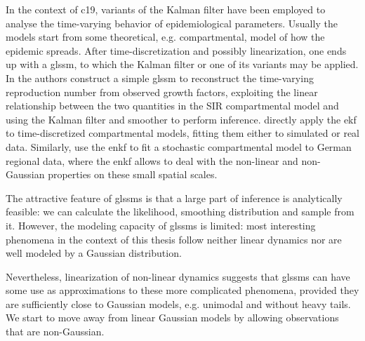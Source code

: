 In the context of \acrshort{c19}, variants of the Kalman filter have been employed to analyse the time-varying behavior of epidemiological parameters. Usually the models start from some theoretical, e.g. compartmental, model of how the epidemic spreads. After time-discretization and possibly linearization, one ends up with a \acrshort{glssm}, to which the Kalman filter or one of its variants may be applied. 
In \citep{Arroyo-Marioli2021Tracking} the authors construct a simple \acrshort{glssm} to reconstruct the time-varying reproduction number from observed growth factors, exploiting the linear relationship between the two quantities in the SIR compartmental model and using the Kalman filter and smoother to perform inference. 
\citep{Zhu2021Extended,Song2021Maximum} directly apply the \acrshort{ekf} to time-discretized compartmental models, fitting them either to simulated \citep{Zhu2021Extended} or real \citep{Song2021Maximum} data. Similarly, \citep{Engbert2020Sequential} use the \acrshort{enkf} to fit a stochastic compartmental model to German regional data, where the \acrshort{enkf} allows to deal with the non-linear and non-Gaussian properties on these small spatial scales.

The attractive feature of \glspl{glssm} is that a large part of inference is analytically feasible: we can calculate the likelihood, smoothing distribution and sample from it. 
However, the modeling capacity of \glspl{glssm} is limited: most interesting phenomena in the context of this thesis follow neither linear dynamics nor are well modeled by a Gaussian distribution.

Nevertheless, linearization of non-linear dynamics suggests that \gls{glssm}s can have some use as approximations to these more complicated phenomena, provided they are sufficiently close to Gaussian models, e.g. unimodal and without heavy tails.
We start to move away from linear Gaussian models by allowing observations that are non-Gaussian.